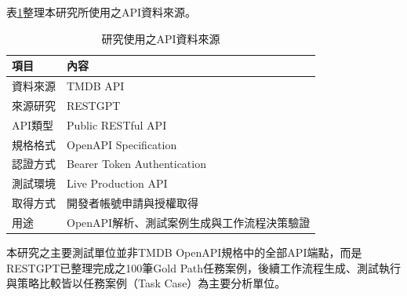 \begin{ZhChapter}
表\ref{tab:tmdb_dataset_source}整理本研究所使用之API資料來源。

\begin{table}[htbp]
\centering
\caption{研究使用之API資料來源}
\label{tab:tmdb_dataset_source}
\renewcommand{\arraystretch}{1.3}
\begin{tabular}{p{4cm} p{10cm}}
\toprule
\textbf{項目} & \textbf{內容} \\
\midrule
資料來源 & TMDB API \\
來源研究 & RESTGPT \parencite{Song2023RestGPT} \\
API類型 & Public RESTful API \\
規格格式 & OpenAPI Specification \\
認證方式 & Bearer Token Authentication \\
測試環境 & Live Production API \\
取得方式 & 開發者帳號申請與授權取得 \\
用途 & OpenAPI解析、測試案例生成與工作流程決策驗證 \\
\bottomrule
\end{tabular}
\end{table}

\text 本研究之主要測試單位並非TMDB OpenAPI規格中的全部API端點，而是RESTGPT已整理完成之100筆Gold Path任務案例，後續工作流程生成、測試執行與策略比較皆以任務案例（Task Case）為主要分析單位。



\end{ZhChapter}
